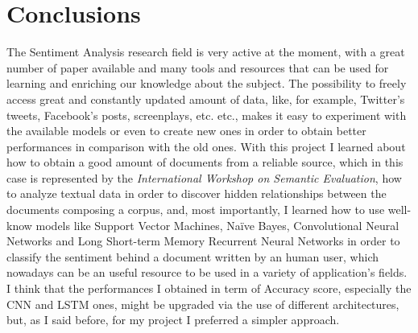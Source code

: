 \documentclass[11pt,twocolumn]{article}
\begin{document}
    \section{Conclusions} %
    \label{sec:conclusions}
        The Sentiment Analysis research field is very active at the moment, with a great number of paper
        available and many tools and resources that can be used for learning and enriching our knowledge
        about
        the subject. The possibility to freely access great and constantly updated amount of data, like, for
        example, Twitter's tweets, Facebook's posts, screenplays, etc. etc., makes it easy to experiment
        with the available models or even to create new ones in order to obtain better performances in
        comparison with the old ones. With this project I learned about how to obtain a good amount of
        documents from a reliable source, which in this case is represented by the
        \textit{International Workshop on Semantic Evaluation}, how to analyze textual data in order to
        discover hidden relationships between the documents composing a corpus, and, most importantly, I
        learned how to use well-know models like Support Vector Machines, Naïve Bayes, Convolutional Neural
        Networks and Long Short-term Memory Recurrent Neural Networks in order to classify the sentiment
        behind a document written by an human user, which nowadays can be an useful resource to be used
        in a variety of application's fields. I think that the performances I obtained in term of Accuracy
        score, especially the CNN and LSTM ones, might be upgraded via the use of different architectures,
        but, as I said before, for my project I preferred a simpler approach.
\end{document}
